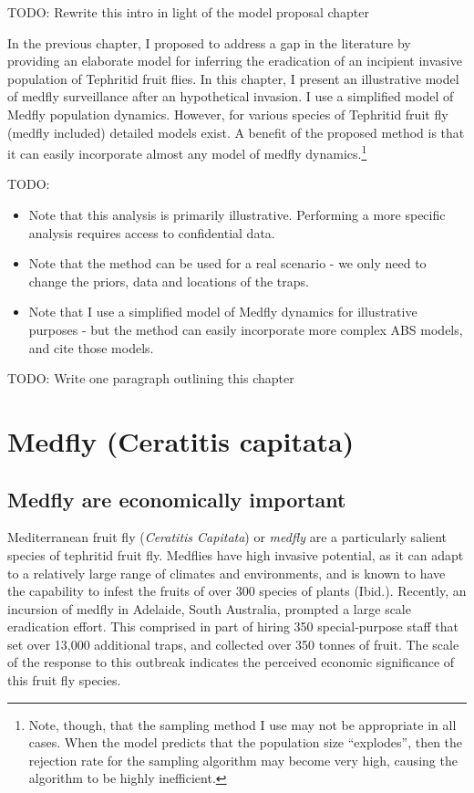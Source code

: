 \documentclass[
  oneside]{book}
\providecommand{\tightlist}{%
  \setlength{\itemsep}{0pt}\setlength{\parskip}{0pt}}
\begin{document}
TODO: Rewrite this intro in light of the model proposal chapter

In the previous chapter, I proposed to address a gap in the literature by providing an elaborate model for inferring the eradication of an incipient invasive population of Tephritid fruit flies. In this chapter, I present an illustrative model of medfly surveillance after an hypothetical invasion. I use a simplified model of Medfly population dynamics. However, for various species of Tephritid fruit fly (medfly included) detailed models exist. A benefit of the proposed method is that it can easily incorporate almost any model of medfly dynamics.\footnote{Note, though, that the sampling method I use may not be appropriate in all cases. When the model predicts that the population size ``explodes'', then the rejection rate for the sampling algorithm may become very high, causing the algorithm to be highly inefficient.}

TODO:

\begin{itemize}
\tightlist
\item
  Note that this analysis is primarily illustrative. Performing a more specific analysis requires access to confidential data.
\item
  Note that the method can be used for a real scenario - we only need to change the priors, data and locations of the traps.
\item
  Note that I use a simplified model of Medfly dynamics for illustrative purposes - but the method can easily incorporate more complex ABS models, and cite those models.
\end{itemize}

TODO: Write one paragraph outlining this chapter

\hypertarget{medfly-ceratitis-capitata}{%
\section{Medfly (Ceratitis capitata)}\label{medfly-ceratitis-capitata}}

\hypertarget{medfly-are-economically-important}{%
\subsection{Medfly are economically important}\label{medfly-are-economically-important}}

Mediterranean fruit fly (\emph{Ceratitis Capitata}) or \emph{medfly} are a particularly salient species of tephritid fruit fly. Medflies have high invasive potential, as it can adapt to a relatively large range of climates and environments, and is known to have the capability to infest the fruits of over 300 species of plants (Ibid.). Recently, an incursion of medfly in Adelaide, South Australia, prompted a large scale eradication effort. This comprised in part of hiring 350 special-purpose staff that set over 13,000 additional traps, and collected over 350 tonnes of fruit. The scale of the response to this outbreak indicates the perceived economic significance of this fruit fly species.
\end{document}
